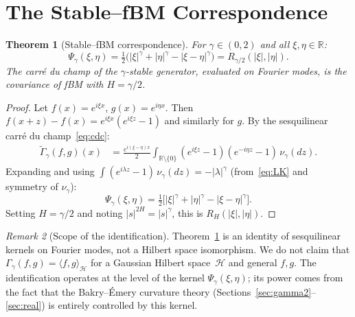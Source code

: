 \documentclass[11pt,a4paper]{article}
\theoremstyle{plain}
\newtheorem{theorem}{Theorem}[section]
\theoremstyle{definition}
\theoremstyle{remark}
\newtheorem{remark}[theorem]{Remark}
\newcommand{\R}{\mathbb{R}}
\begin{document}
\section{The Stable--fBM Correspondence}\label{sec:duality}

\begin{theorem}[Stable--fBM correspondence]\label{thm:duality}
For $\gamma \in (0,2)$ and all $\xi, \eta \in \R$:
\begin{equation}\label{eq:duality}
  \Psi_\gamma(\xi,\eta)
  = \tfrac{1}{2}\bigl(|\xi|^\gamma + |\eta|^\gamma
  - |\xi - \eta|^\gamma\bigr)
  = R_{\gamma/2}(|\xi|, |\eta|).
\end{equation}
The carr\'e du champ of the $\gamma$-stable generator, evaluated
on Fourier modes, is the covariance of fBM with $H = \gamma/2$.
\end{theorem}

\begin{proof}
Let $f(x) = e^{i\xi x}$, $g(x) = e^{i\eta x}$.
Then $f(x+z) - f(x) = e^{i\xi x}(e^{i\xi z} - 1)$ and similarly
for $g$. By the sesquilinear carr\'e du champ~\eqref{eq:cdc}:
\begin{align*}
  \widetilde\Gamma_\gamma(f,g)(x)
  &= \frac{e^{i(\xi-\eta)x}}{2}\int_{\R \setminus \{0\}}
     (e^{i\xi z} - 1)(e^{-i\eta z} - 1)\,\nu_\gamma(dz).
\end{align*}
Expanding and using $\int (e^{i\lambda z} - 1)\,\nu_\gamma(dz)
= -|\lambda|^\gamma$ (from~\eqref{eq:LK} and symmetry of $\nu_\gamma$):
\[
  \Psi_\gamma(\xi,\eta)
  = \tfrac{1}{2}\bigl[|\xi|^\gamma + |\eta|^\gamma
  - |\xi - \eta|^\gamma\bigr].
\]
Setting $H = \gamma/2$ and noting $|s|^{2H} = |s|^\gamma$,
this is $R_H(|\xi|, |\eta|)$.
\end{proof}

\begin{remark}[Scope of the identification]\label{rem:scope}
Theorem~\ref{thm:duality} is an identity of sesquilinear kernels
on Fourier modes, not a Hilbert space isomorphism. We do not claim
that $\Gamma_\gamma(f,g) = \langle f,g \rangle_{\mathcal{H}}$ for
a Gaussian Hilbert space~$\mathcal{H}$ and general $f,g$.
The identification operates at the level of the kernel
$\Psi_\gamma(\xi,\eta)$; its power comes from the fact that the
Bakry--\'Emery curvature theory (Sections~\ref{sec:gamma2}--\ref{sec:real})
is entirely controlled by this kernel.
\end{remark}
\end{document}
